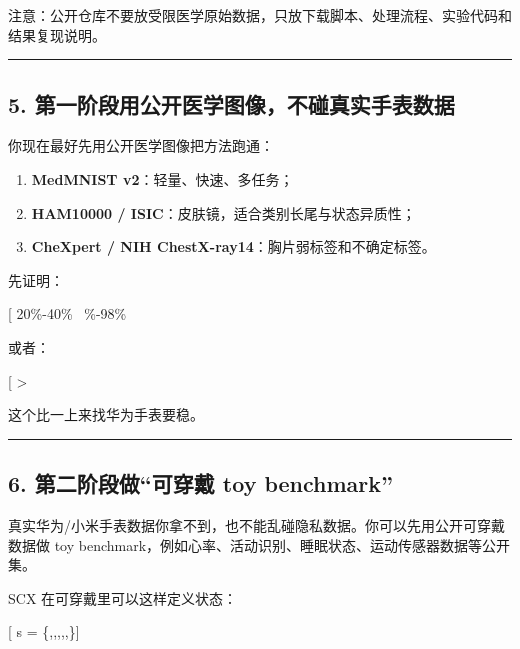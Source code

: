 \documentclass[
  12pt,
]{ctexart}
\providecommand{\tightlist}{%
  \setlength{\itemsep}{0pt}\setlength{\parskip}{0pt}}
\begin{document}
注意：公开仓库不要放受限医学原始数据，只放下载脚本、处理流程、实验代码和结果复现说明。

\begin{center}\rule{0.5\linewidth}{0.5pt}\end{center}

\subsection{5.
第一阶段用公开医学图像，不碰真实手表数据}\label{ux7b2cux4e00ux9636ux6bb5ux7528ux516cux5f00ux533bux5b66ux56feux50cfux4e0dux78b0ux771fux5b9eux624bux8868ux6570ux636e}

你现在最好先用公开医学图像把方法跑通：

\begin{enumerate}
\def\labelenumi{\arabic{enumi}.}
\tightlist
\item
  \textbf{MedMNIST v2}：轻量、快速、多任务；
\item
  \textbf{HAM10000 / ISIC}：皮肤镜，适合类别长尾与状态异质性；
\item
  \textbf{CheXpert / NIH ChestX-ray14}：胸片弱标签和不确定标签。
\end{enumerate}

先证明：

{[} 20\%-40\%~ \%-98\%~\text{full-data performance}{]}

或者：

{[}  \textgreater{}
\text{random subset / uncertainty subset / diversity subset}{]}

这个比一上来找华为手表要稳。

\begin{center}\rule{0.5\linewidth}{0.5pt}\end{center}

\subsection{6. 第二阶段做``可穿戴 toy
benchmark''}\label{ux7b2cux4e8cux9636ux6bb5ux505aux53efux7a7fux6234-toy-benchmark}

真实华为/小米手表数据你拿不到，也不能乱碰隐私数据。你可以先用公开可穿戴数据做
toy benchmark，例如心率、活动识别、睡眠状态、运动传感器数据等公开集。

SCX 在可穿戴里可以这样定义状态：

{[} s =
\{,,,,,\}{]}
\end{document}

